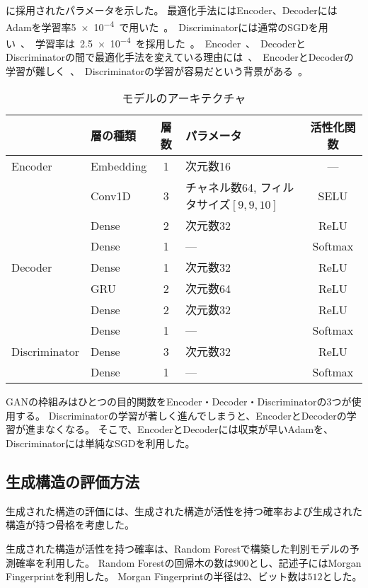 に採用されたパラメータを示した。
最適化手法にはEncoder、DecoderにはAdamを学習率\SI{5e-4}で用いた。
Discriminatorには通常のSGDを用い、学習率は\SI{2.5e-4}を採用した。
Encoder、DecoderとDiscriminatorの間で最適化手法を変えている理由には、
EncoderとDecoderの学習が難しく、Discriminatorの学習が容易だという背景がある。
\begin{table}[tbp]
    \centering
    \caption{モデルのアーキテクチャ} \label{tb:aae_model_detail}
    \begin{tabular}{llclc}\hline
     & 層の種類 & 層数 & パラメータ & 活性化関数 \\\hline
     Encoder & Embedding & 1 & 次元数16 & --- \\
     & Conv1D & 3 & チャネル数64, フィルタサイズ$[9, 9, 10]$ & SELU \\
     & Dense & 2 & 次元数32 & ReLU \\
     & Dense & 1 & --- & Softmax \\\hline
     Decoder & Dense & 1 & 次元数32 & ReLU \\
     & GRU & 2 & 次元数64 & ReLU \\
     & Dense & 2 & 次元数32 & ReLU \\
     & Dense & 1 & --- & Softmax \\\hline
    Discriminator & Dense & 3 & 次元数32 & ReLU \\
    & Dense & 1 & --- & Softmax \\\hline
    \end{tabular}
\end{table}

GANの枠組みはひとつの目的関数をEncoder・Decoder・Discriminatorの3つが使用する。
Discriminatorの学習が著しく進んでしまうと、EncoderとDecoderの学習が進まなくなる。
そこで、EncoderとDecoderには収束が早いAdamを、Discriminatorには単純なSGDを利用した。

\subsection{生成構造の評価方法} \label{sec:structure_check}

生成された構造の評価には、生成された構造が活性を持つ確率および生成された構造が持つ骨格を考慮した。

生成された構造が活性を持つ確率は、Random Forestで構築した判別モデルの予測確率を利用した。
Random Forestの回帰木の数は$900$とし、記述子にはMorgan Fingerprintを利用した。
Morgan Fingerprintの半径は$2$、ビット数は$512$とした。

